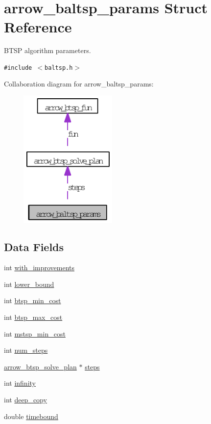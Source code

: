 \hypertarget{structarrow__baltsp__params}{
\section{arrow\_\-baltsp\_\-params Struct Reference}
\label{structarrow__baltsp__params}
}
BTSP algorithm parameters.  


{\tt \#include $<$baltsp.h$>$}

Collaboration diagram for arrow\_\-baltsp\_\-params:\nopagebreak
\begin{figure}[H]
\begin{center}
\leavevmode
\includegraphics[width=136pt]{structarrow__baltsp__params__coll__graph}
\end{center}
\end{figure}
\subsection*{Data Fields}
\begin{CompactItemize}
\item 
int \hyperlink{structarrow__baltsp__params_7147e8fd0ebe031a8d5d36370a206340}{with\_\-improvements}
\item 
int \hyperlink{structarrow__baltsp__params_0b0ba660a5908a16839b024dc3469c11}{lower\_\-bound}
\item 
int \hyperlink{structarrow__baltsp__params_81da2be762548a7f677f69266b0293eb}{btsp\_\-min\_\-cost}
\item 
int \hyperlink{structarrow__baltsp__params_b21fe0ed58f267896e5fe0569a4ed7fa}{btsp\_\-max\_\-cost}
\item 
int \hyperlink{structarrow__baltsp__params_bead1abd279aeeb7af8e59538df09118}{mstsp\_\-min\_\-cost}
\item 
int \hyperlink{structarrow__baltsp__params_9be4abd8a4912b119b55e35f9b8cfe13}{num\_\-steps}
\item 
\hyperlink{structarrow__btsp__solve__plan}{arrow\_\-btsp\_\-solve\_\-plan} $\ast$ \hyperlink{structarrow__baltsp__params_3b293a7e80cd4bec67ede60bab8007b1}{steps}
\item 
int \hyperlink{structarrow__baltsp__params_facdd37c1df03423ac58a84019ddedf3}{infinity}
\item 
int \hyperlink{structarrow__baltsp__params_b7de31c488ac81bafec9c2eface46e1e}{deep\_\-copy}
\item 
double \hyperlink{structarrow__baltsp__params_0ff80620b5045d4769810df2b4de7063}{timebound}
\end{CompactItemize}


